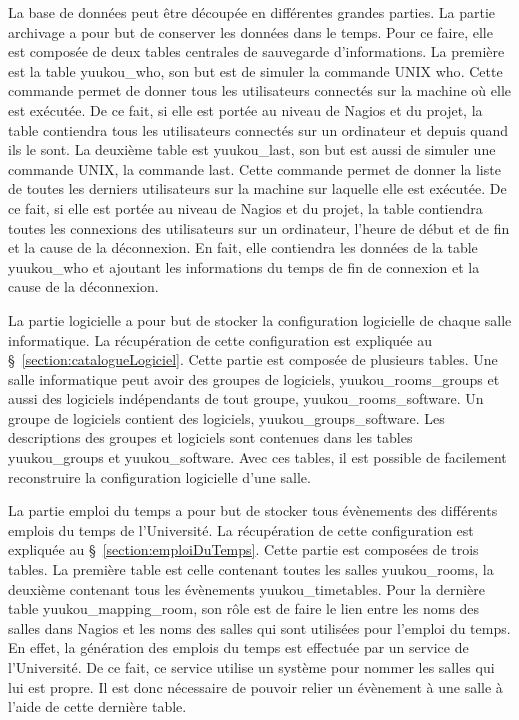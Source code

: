 La base de donn\'ees peut \^etre d\'ecoup\'ee en diff\'erentes grandes parties.
La partie archivage a pour but de conserver les donn\'ees dans le temps.
Pour ce faire, elle est compos\'ee de deux tables centrales de sauvegarde d'informations.
La premi\`ere est la table \textsf{yuukou\_who}, son but est de simuler la commande UNIX \textsf{who}.
Cette commande permet de donner tous les utilisateurs connect\'es sur la machine o\`u elle est ex\'ecut\'ee.
De ce fait, si elle est port\'ee au niveau de Nagios et du projet, la table contiendra tous les utilisateurs connect\'es sur un ordinateur et depuis quand ils le sont.
La deuxi\`eme table est \textsf{yuukou\_last}, son but est aussi de simuler une commande UNIX, la commande \textsf{last}.
Cette commande permet de donner la liste de toutes les derniers utilisateurs sur la machine sur laquelle elle est ex\'ecut\'ee.
De ce fait, si elle est port\'ee au niveau de Nagios et du projet, la table contiendra toutes les connexions des utilisateurs sur un ordinateur, l'heure de d\'ebut et de fin et la cause de la d\'econnexion. En fait, elle contiendra les donn\'ees de la table \textsf{yuukou\_who} et ajoutant les informations du temps de fin de connexion et la cause de la d\'econnexion.

La partie logicielle a pour but de stocker la configuration logicielle de chaque salle informatique.
La r\'ecup\'eration de cette configuration est expliqu\'ee au \S~\ref{section:catalogueLogiciel}.
Cette partie est compos\'ee de plusieurs tables.
Une salle informatique peut avoir des groupes de logiciels, \textsf{yuukou\_rooms\_groups} et aussi des logiciels ind\'ependants de tout groupe, \textsf{yuukou\_rooms\_software}.
Un groupe de logiciels contient des logiciels, \textsf{yuukou\_groups\_software}.
Les descriptions des groupes et logiciels sont contenues dans les tables \textsf{yuukou\_groups} et \textsf{yuukou\_software}.
Avec ces tables, il est possible de facilement reconstruire la configuration logicielle d'une salle.

La partie emploi du temps a pour but de stocker tous \'ev\`enements des diff\'erents emplois du temps de l'Universit\'e.
La r\'ecup\'eration de cette configuration est expliqu\'ee au \S~\ref{section:emploiDuTemps}.
Cette partie est compos\'ees de trois tables.
La premi\`ere table est celle contenant toutes les salles \textsf{yuukou\_rooms}, la deuxi\`eme contenant tous les \'ev\`enements \textsf{yuukou\_timetables}.
Pour la derni\`ere table \textsf{yuukou\_mapping\_room}, son r\^ole est de faire le lien entre les noms des salles dans Nagios et les noms des salles qui sont utilis\'ees pour l'emploi du temps.
En effet, la g\'en\'eration des emplois du temps est effectu\'ee par un service de l'Universit\'e.
De ce fait, ce service utilise un syst\`eme pour nommer les salles qui lui est propre.
Il est donc n\'ecessaire de pouvoir relier un \'ev\`enement \`a une salle \`a l'aide de cette derni\`ere table.

